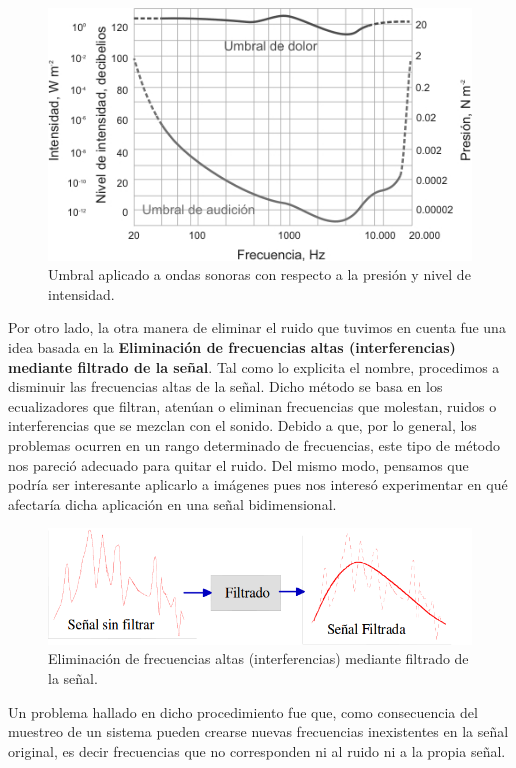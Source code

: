 \documentclass[10pt, a4paper]{article}
\begin{document}
\begin{itemize}
\begin{figure}[H] %
\begin{center}
\includegraphics[width=350pt]{./umbrales.jpg}
\caption[h]{Umbral aplicado a ondas sonoras con respecto a la presión y nivel de intensidad.}
\end{center}
\end{figure}

Por otro lado, la otra manera de eliminar el ruido que tuvimos en cuenta fue una idea basada en la {\textbf{Eliminación de frecuencias altas (interferencias) mediante filtrado de la señal}}. Tal como lo explicita el nombre, procedimos a disminuir las frecuencias altas de la señal. Dicho método se basa en los ecualizadores que filtran, atenúan o eliminan frecuencias que molestan, ruidos o interferencias que se mezclan con el sonido. Debido a que, por lo general, los problemas ocurren en un rango determinado de frecuencias, este tipo de método nos pareció adecuado para quitar el ruido. Del mismo modo, pensamos que podría ser interesante aplicarlo a imágenes pues nos interesó experimentar en qué afectaría dicha aplicación en una señal bidimensional.
\newline

\begin{figure}[H] %
\begin{center}
\includegraphics[width=350pt]{./eliminar_frecuencias.png}
\caption[H]{Eliminación de frecuencias altas (interferencias) mediante filtrado de la señal.}
\end{center}
\end{figure}
Un problema hallado en dicho procedimiento fue que, como consecuencia del muestreo de un sistema pueden crearse nuevas frecuencias inexistentes en la señal original, es decir frecuencias que no corresponden ni al ruido ni a la propia señal.\newline


\end{itemize}
\end{document}
